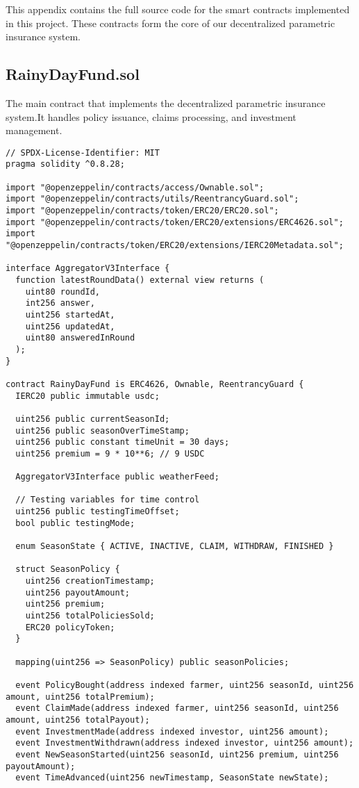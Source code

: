 	This appendix contains the full source code for the smart contracts implemented in this project.
    These contracts form the core of our decentralized parametric insurance system.

	\subsection{RainyDayFund.sol}\label{subsec:rainy-day-fund}
	The main contract that implements the decentralized parametric insurance system.It handles policy issuance, claims processing, and investment management.

	\begin{lstlisting}[style=soliditystyle, caption={RainyDayFund.sol - Main Insurance Contract},label={lst:lstlisting}]
// SPDX-License-Identifier: MIT
pragma solidity ^0.8.28;

import "@openzeppelin/contracts/access/Ownable.sol";
import "@openzeppelin/contracts/utils/ReentrancyGuard.sol";
import "@openzeppelin/contracts/token/ERC20/ERC20.sol";
import "@openzeppelin/contracts/token/ERC20/extensions/ERC4626.sol";
import "@openzeppelin/contracts/token/ERC20/extensions/IERC20Metadata.sol";

interface AggregatorV3Interface {
  function latestRoundData() external view returns (
    uint80 roundId,
    int256 answer,
    uint256 startedAt,
    uint256 updatedAt,
    uint80 answeredInRound
  );
}

contract RainyDayFund is ERC4626, Ownable, ReentrancyGuard {
  IERC20 public immutable usdc;

  uint256 public currentSeasonId;
  uint256 public seasonOverTimeStamp;
  uint256 public constant timeUnit = 30 days;
  uint256 premium = 9 * 10**6; // 9 USDC

  AggregatorV3Interface public weatherFeed;

  // Testing variables for time control
  uint256 public testingTimeOffset;
  bool public testingMode;

  enum SeasonState { ACTIVE, INACTIVE, CLAIM, WITHDRAW, FINISHED }

  struct SeasonPolicy {
    uint256 creationTimestamp;
    uint256 payoutAmount;
    uint256 premium;
    uint256 totalPoliciesSold;
    ERC20 policyToken;
  }

  mapping(uint256 => SeasonPolicy) public seasonPolicies;

  event PolicyBought(address indexed farmer, uint256 seasonId, uint256 amount, uint256 totalPremium);
  event ClaimMade(address indexed farmer, uint256 seasonId, uint256 amount, uint256 totalPayout);
  event InvestmentMade(address indexed investor, uint256 amount);
  event InvestmentWithdrawn(address indexed investor, uint256 amount);
  event NewSeasonStarted(uint256 seasonId, uint256 premium, uint256 payoutAmount);
  event TimeAdvanced(uint256 newTimestamp, SeasonState newState);


\end{lstlisting}
